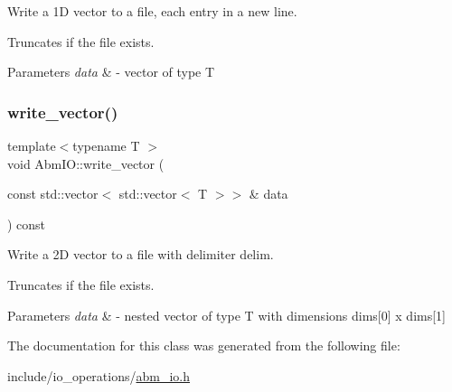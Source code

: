 Write a 1D vector to a file, each entry in a new line. 

Truncates if the file exists. 
\begin{DoxyParams}{Parameters}
{\em data} & -\/ vector of type T \\
\hline
\end{DoxyParams}
\mbox{\label{classAbmIO_a3d630a2352e1e9e0337c419637f16060}} 
\subsubsection{\texorpdfstring{write\+\_\+vector()}{write\_vector()}\hspace{0.1cm}{\footnotesize\ttfamily [2/2]}}
{\footnotesize\ttfamily template$<$typename T $>$ \\
void Abm\+I\+O\+::write\+\_\+vector (\begin{DoxyParamCaption}\item[{const std\+::vector$<$ std\+::vector$<$ T $>$$>$ \&}]{data }\end{DoxyParamCaption}) const}



Write a 2D vector to a file with delimiter delim. 

Truncates if the file exists. 
\begin{DoxyParams}{Parameters}
{\em data} & -\/ nested vector of type T with dimensions dims\mbox{[}0\mbox{]} x dims\mbox{[}1\mbox{]} \\
\hline
\end{DoxyParams}


The documentation for this class was generated from the following file\+:\begin{DoxyCompactItemize}
\item 
include/io\+\_\+operations/\hyperlink{abm__io_8h}{abm\+\_\+io.\+h}\end{DoxyCompactItemize}
